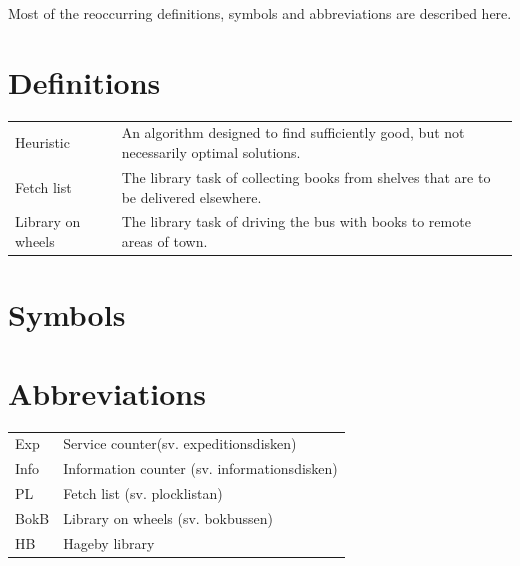 \documentclass[a4paper, 10pt, twoside, openright]{book}
\begin{document}
Most of the reoccurring definitions, symbols and abbreviations are described here.

\section*{Definitions}
\begin{tabular}{lp{10cm}}

Heuristic & An algorithm designed to find sufficiently good, but not necessarily optimal solutions. \\
Fetch list & The library task of collecting books from shelves that are to be delivered elsewhere. \\
Library on wheels & The library task of driving the bus with books to remote areas of town. \\
\end{tabular}

\section*{Symbols}


\section*{Abbreviations}

\begin{tabular}{ll}
Exp		& Service counter(sv. expeditionsdisken) \\
Info	& Information counter (sv. informationsdisken)\\
PL		& Fetch list (sv. plocklistan)\\
BokB    & Library on wheels (sv. bokbussen)\\
HB      & Hageby library \\
\end{tabular}
\end{document}
